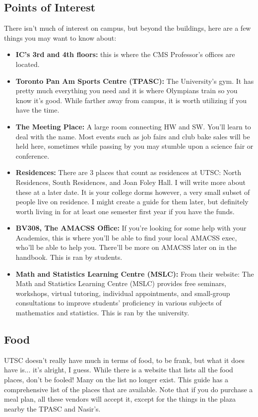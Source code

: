 \documentclass[11pt]{article}
\begin{document}
\subsection{Points of Interest}
There isn't much of interest on campus, but beyond the buildings, here are a few things you may want to know about:
\begin{itemize}
    \item \textbf{IC's 3rd and 4th floors:} this is where the CMS Professor's offices are located. 
    \item \textbf{Toronto Pan Am Sports Centre (TPASC):} The University's gym. It has pretty much everything you need and it is where Olympians train so you know it's good. While farther away from campus, it is worth utilizing if you have the time.
    \item \textbf{The Meeting Place:} A large room connecting HW and SW. You'll learn to deal with the name. Most events such as job fairs and club bake sales will be held here, sometimes while passing by you may stumble upon a science fair or conference. 
    \item \textbf{Residences:} There are 3 places that count as residences at UTSC: North Residences, South Residences, and Joan Foley Hall. I will write more about these at a later date. It is your college dorms however, a very small subset of people live on residence. I might create a guide for them later, but definitely worth living in for at least one semester first year if you have the funds.
    \item \textbf{BV308, The AMACSS Office:} If you're looking for some help with your Academics, this is where you'll be able to find your local AMACSS exec, who'll be able to help you. There'll be more on AMACSS later on in the handbook. This is ran by students.
    \item \textbf{Math and Statistics Learning Centre (MSLC):} From their website: The Math and Statistics Learning Centre (MSLC) provides free seminars, workshops, virtual tutoring, individual appointments, and small-group consultations to improve students’ proficiency in various subjects of mathematics and statistics. This is ran by the university.
\end{itemize}

\subsection{Food}
UTSC doesn't really have much in terms of food, to be frank, but what it does have is... it's alright, I guess. While there is a website that lists all the food places, don't be fooled! Many on the list no longer exist. This guide has a comprehensive list of the places that are available. Note that if you do purchase a meal plan, all these vendors will accept it, except for the things in the plaza nearby the TPASC and Nasir's.\par
\end{document}
